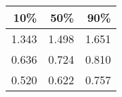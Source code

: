 \begin{table}[ht]
\centering
\begin{tabular}{rrr}
  \hline
10\% & 50\% & 90\% \\ 
  \hline
1.343 & 1.498 & 1.651 \\ 
  0.636 & 0.724 & 0.810 \\ 
  0.520 & 0.622 & 0.757 \\ 
   \hline
\end{tabular}
\end{table}
